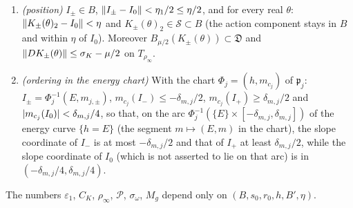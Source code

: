 \begin{proposition}
\begin{enumerate}[label=(T\arabic*)]
\item\label{bpI:p3:T6} \emph{(position)} $I_\pm\in B$, $\lVert I_\pm-I_0\rVert<\eta_1/2\le\eta/2$, and for every real $\theta$: $\lVert K_\pm(\theta)_2-I_0\rVert<\eta$ and $K_\pm(\theta)_2\in\mathcal S\subset B$ (the action component stays in $B$ and within $\eta$ of $I_0$). Moreover $B_{\mu/2}(K_\pm(\theta))\subset\mathfrak D$ and $\lVert DK_\pm(\theta)\rVert\le\sigma_K-\mu/2$ on $T_{\rho_\infty}$.
\item\label{bpI:p3:T7} \emph{(ordering in the energy chart)} With the chart $\Phi_j=(h,m_{c_j})$ of $\mathfrak p_j$: $I_\pm=\Phi_j^{-1}(E,m_{j,\pm})$, $m_{c_j}(I_-)\le-\delta_{m,j}/2$, $m_{c_j}(I_+)\ge\delta_{m,j}/2$ and $\lvert m_{c_j}(I_0)\rvert<\delta_{m,j}/4$, so that, on the arc $\Phi_j^{-1}(\{E\}\times[-\delta_{m,j},\delta_{m,j}])$ of the energy curve $\{h=E\}$ (the segment $m\mapsto(E,m)$ in the chart), the slope coordinate of $I_-$ is at most $-\delta_{m,j}/2$ and that of $I_+$ at least $\delta_{m,j}/2$, while the slope coordinate of $I_0$ (which is not asserted to lie on that arc) is in $(-\delta_{m,j}/4,\delta_{m,j}/4)$.
\end{enumerate}
The numbers $\varepsilon_1$, $C_K$, $\rho_\infty$, $\mathcal P$, $\sigma_\omega$, $M_g$ depend only on $(B,s_0,r_0,h,B',\eta)$.
\end{proposition}
